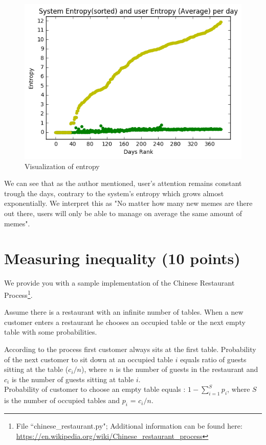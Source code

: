 \documentclass{WeSTassignment}
\begin{document}
\begin{figure}[h]
  \centering
  \includegraphics{entropy.png}
   \caption{Visualization of entropy}
     \label{fig:dig} 
\end{figure}


We can see that as the author mentioned, user's attention remains constant trough the days, contrary to the system's entropy which grows almost exponentially. We interpret this as "No matter how many new memes are there out there, users will only be able to manage on average the same amount of memes".


\section{Measuring inequality (10 points)}

We provide you with a sample implementation of the Chinese Restaurant Process\footnote{File ``chinese\_restaurant.py"; Additional information can be found here: \url{https://en.wikipedia.org/wiki/Chinese_restaurant_process}}.

Assume there is a restaurant with an infinite number of tables. 
When a new customer enters a restaurant he chooses an occupied table or the next empty table with some probabilities.


According to the process first customer always sits at the first table. 
Probability of the next customer to sit down at an occupied table $i$ equals 
 ratio of guests sitting at the table ($c_i/n$), where $n$ is the number of guests in the restaurant and $c_i$ is the number of guests sitting at table $i$.\\
 Probability of customer to choose an empty table equals :  $1- \sum_{i=1}^{S}{p_i}$, where $S$ is the number of occupied tables and ${p_i}$ = $c_i/n$.
 
\end{document}
